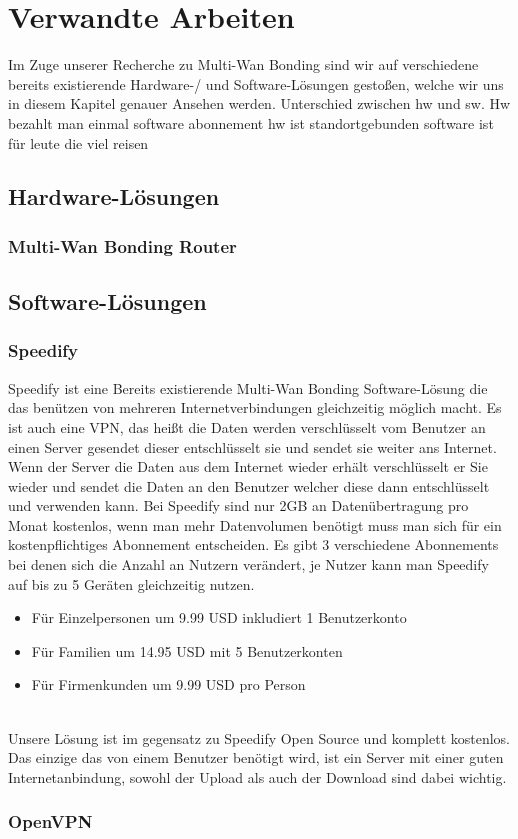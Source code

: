 \chapter{Verwandte Arbeiten}
\label{chap:VerwandteArbeiten}

Im Zuge unserer Recherche zu Multi-Wan Bonding sind wir auf verschiedene bereits existierende Hardware-/ und Software-Lösungen gestoßen, welche wir uns in diesem Kapitel genauer Ansehen werden.
Unterschied zwischen hw und sw. Hw bezahlt man einmal software abonnement hw ist standortgebunden software ist für leute die viel reisen
\section{Hardware-Lösungen}
\subsection{Multi-Wan Bonding Router}
\section{Software-Lösungen}
\subsection{Speedify}
Speedify ist eine Bereits existierende Multi-Wan Bonding Software-Lösung die das benützen von mehreren Internetverbindungen gleichzeitig möglich macht. Es ist auch eine VPN, das heißt die Daten werden verschlüsselt vom Benutzer an einen Server gesendet dieser entschlüsselt sie und sendet sie weiter ans Internet. Wenn der Server die Daten aus dem Internet wieder erhält verschlüsselt er Sie wieder und sendet die Daten an den Benutzer welcher diese dann entschlüsselt und verwenden kann.
Bei Speedify sind nur 2GB an Datenübertragung pro Monat kostenlos, wenn man mehr Datenvolumen benötigt muss man sich für ein kostenpflichtiges Abonnement entscheiden. Es gibt 3 verschiedene Abonnements bei denen sich die Anzahl an Nutzern verändert, je Nutzer kann man Speedify auf bis zu 5 Geräten gleichzeitig nutzen.
\begin{itemize}
    \item Für Einzelpersonen um 9.99 USD inkludiert 1 Benutzerkonto
    \item Für Familien um 14.95 USD mit 5 Benutzerkonten
    \item Für Firmenkunden um 9.99 USD pro Person
\end{itemize}
\  \\
Unsere Lösung ist im gegensatz zu Speedify Open Source und komplett kostenlos. Das einzige das von einem Benutzer benötigt wird, ist ein Server mit einer guten Internetanbindung, sowohl der Upload als auch der Download sind dabei wichtig.
\subsection{OpenVPN}
